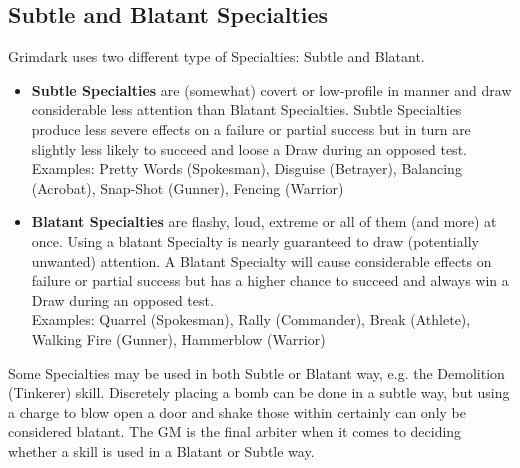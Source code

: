 \subsection{Subtle and Blatant Specialties}
\label{skill_types}
Grimdark uses two different type of Specialties: Subtle and Blatant.
\begin{itemize}
	\item \textbf{Subtle Specialties} are (somewhat) covert or low-profile in manner and draw considerable less attention than Blatant Specialties. 
	Subtle Specialties produce less severe effects on a failure or partial success but in turn are slightly less likely to succeed and loose a Draw during an opposed test.\\
	Examples: Pretty Words (Spokesman), Disguise (Betrayer), Balancing (Acrobat), Snap-Shot (Gunner), Fencing (Warrior)

	\item \textbf{Blatant Specialties} are flashy, loud, extreme or all of them (and more) at once. 
	Using a blatant Specialty is nearly guaranteed to draw (potentially unwanted) attention.
	A Blatant Specialty will cause considerable effects on failure or partial success but has a higher chance to succeed and always win a Draw during an opposed test.\\
	Examples: Quarrel (Spokesman), Rally (Commander), Break (Athlete), Walking Fire (Gunner), Hammerblow (Warrior)
\end{itemize}
Some Specialties may be used in both Subtle or Blatant way, e.g. the Demolition (Tinkerer) skill. 
Discretely placing a bomb can be done in a subtle way, but using a charge to blow open a door and shake those within certainly can only be considered blatant.
The GM is the final arbiter when it comes to deciding whether a skill is used in a Blatant or Subtle way.




